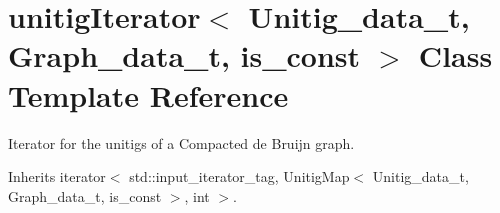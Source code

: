 \hypertarget{classunitigIterator}{}\section{unitig\+Iterator$<$ Unitig\+\_\+data\+\_\+t, Graph\+\_\+data\+\_\+t, is\+\_\+const $>$ Class Template Reference}
\label{classunitigIterator}


Iterator for the unitigs of a Compacted de Bruijn graph.  




Inherits iterator$<$ std\+::input\+\_\+iterator\+\_\+tag, Unitig\+Map$<$ Unitig\+\_\+data\+\_\+t, Graph\+\_\+data\+\_\+t, is\+\_\+const $>$, int $>$.

